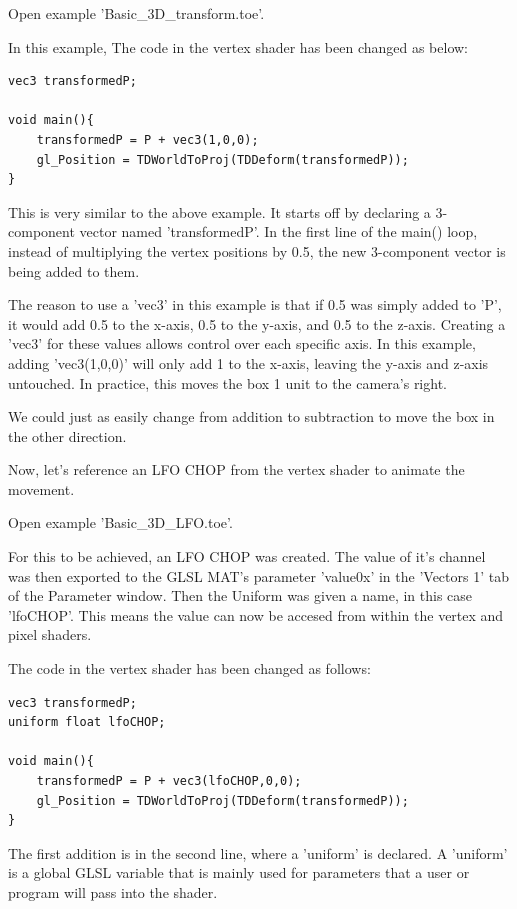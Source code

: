 \begin{fullwidth}
Open example 'Basic\_3D\_transform.toe'.

In this example, The code in the vertex shader has been changed as below:

\begin{lstlisting}
vec3 transformedP;

void main(){
	transformedP = P + vec3(1,0,0);
	gl_Position = TDWorldToProj(TDDeform(transformedP));
}
\end{lstlisting}

This is very similar to the above example. It starts off by declaring a 3-component vector named 'transformedP'. In the first line of the main() loop, instead of multiplying the vertex positions by 0.5, the new 3-component vector is being added to them. 

The reason to use a 'vec3' in this example is that if 0.5 was simply added to 'P', it would add 0.5 to the x-axis, 0.5 to the y-axis, and 0.5 to the z-axis. Creating a 'vec3' for these values allows control over each specific axis. In this example, adding 'vec3(1,0,0)' will only add 1 to the x-axis, leaving the y-axis and z-axis untouched. In practice, this moves the box 1 unit to the camera's right.

We could just as easily change from addition to subtraction to move the box in the other direction. 

Now, let's reference an LFO CHOP from the vertex shader to animate the movement.

Open example 'Basic\_3D\_LFO.toe'.

For this to be achieved, an LFO CHOP was created. The value of it's channel was then exported to the GLSL MAT's parameter 'value0x' in the 'Vectors 1' tab of the Parameter window. Then the Uniform was given a name, in this case 'lfoCHOP'. This means the value can now be accesed from within the vertex and pixel shaders. 

The code in the vertex shader has been changed as follows:

\begin{lstlisting}
vec3 transformedP;
uniform float lfoCHOP;

void main(){
	transformedP = P + vec3(lfoCHOP,0,0);
	gl_Position = TDWorldToProj(TDDeform(transformedP));
}
\end{lstlisting}

The first addition is in the second line, where a 'uniform' is declared. A 'uniform' is a global GLSL variable that is mainly used for parameters that a user or program will pass into the shader.


\end{fullwidth}

